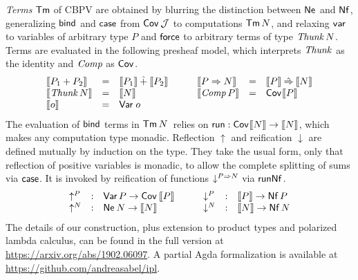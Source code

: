\documentclass[a4paper]{easychair}
\renewcommand{\patom}{\ensuremath{o}}
\begin{document}
\emph{Terms} $\mathsf{Tm}$ of CBPV are obtained by blurring the
distinction between $\mathsf{Ne}^{}$ and $\mathsf{Nf}$,
generalizing $\mathsf{bind}$ and $\mathsf{case}$ from $\mathsf{Cov}^{}\,\mathcal{J}$ to
computations $\mathsf{Tm}\,N$,
and relaxing $\mathsf{var}$ to variables
of arbitrary type $P$ and $\mathsf{force}$ to arbitrary terms of type
$\mathit{Thunk}\,N$.  Terms are evaluated in the following presheaf model,
which interprets $\mathit{Thunk}$ as the identity and $\mathit{Comp}$ as $\mathsf{Cov}^{}$.
\[
\begin{array}[t]{lcl}
  \den{P_1 + P_2} & = & \den{P_1} \hatplus \den{P_2} \\
  \den{\Thunk N} & = & \den N \\
  \den{\patom} & = & \tVar\;\patom \\
\end{array}
\qquad
\begin{array}[t]{lcl}
  \den{P \To N} & = & \den P \hatto \den N \\
  \den{\Comp P} & = & \Cov \den P \\
\end{array}
\]
The evaluation of $\mathsf{bind}$ terms in $\Tm N$ relies on
$\mathsf{run} : \mathsf{Cov}^{} \mathopen{{[\kern-0.14em[}} N \mathclose{{]\kern-0.14em]}} \to \mathopen{{[\kern-0.14em[}} N \mathclose{{]\kern-0.14em]}}$, which makes any computation type
monadic.  Reflection $\uparrow$ and reification $\downarrow$ are
defined mutually by induction on the type.  They take the
usual form, only that reflection of positive variables is monadic, to
allow the complete splitting of sums via $\mathsf{case}$.
It is invoked by reification of functions $\mathord{\downarrow_{}^{P \Rightarrow N}}$ via $\mathsf{runNf}^{}$.
\[
\begin{array}[t]{lcl}
  \mathord{\uparrow_{}^{P}}  & : & \mathsf{Var}\, P \to \mathsf{Cov}^{}\,\mathopen{{[\kern-0.14em[}} P \mathclose{{]\kern-0.14em]}} \\
  \mathord{\uparrow_{}^{N}} & : & \mathsf{Ne}^{}\,N \to \mathopen{{[\kern-0.14em[}} N \mathclose{{]\kern-0.14em]}} \\
\end{array}
\qquad
\begin{array}[t]{lcl}
  \mathord{\downarrow_{}^{P}} & : & \mathopen{{[\kern-0.14em[}} P \mathclose{{]\kern-0.14em]}} \to \mathsf{Nf}\,P \\
  \mathord{\downarrow_{}^{N}} & : & \mathopen{{[\kern-0.14em[}} N \mathclose{{]\kern-0.14em]}} \to \mathsf{Nf}\,N \\
\end{array}
\]
The details of our construction, plus extension to product types and
polarized lambda calculus, can be found in the full version at
\url{https://arxiv.org/abs/1902.06097}.
A partial Agda formalization is available at
\url{https://github.com/andreasabel/ipl}.
\end{document}
